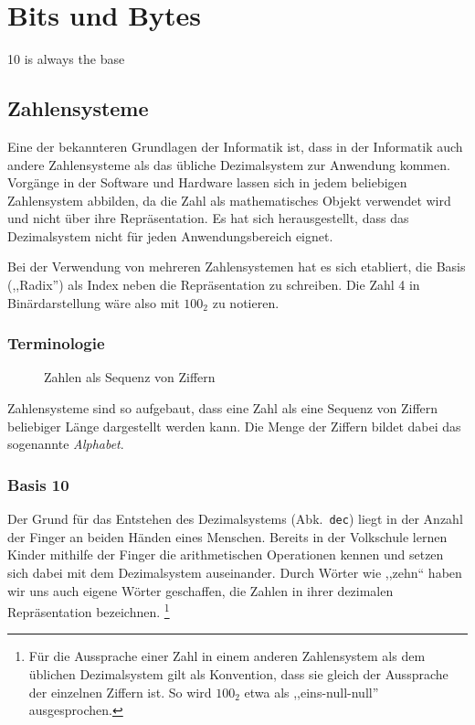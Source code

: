 \chapter{Bits und Bytes}
\epigraph{10 is always the base}{}
\newcommand{\short}[1]{Abk.~\texttt{#1}}
%
\section{Zahlensysteme}
%
Eine der bekannteren Grundlagen der Informatik ist, dass in der Informatik
auch andere Zahlensysteme als das übliche Dezimalsystem zur Anwendung kommen.
Vorgänge in der Software und Hardware lassen sich in jedem beliebigen
Zahlensystem abbilden, da die Zahl als mathematisches Objekt verwendet wird
und nicht über ihre Repräsentation. Es hat sich herausgestellt, dass das
Dezimalsystem nicht für jeden Anwendungsbereich eignet.

Bei der Verwendung von mehreren Zahlensystemen hat es sich etabliert,
die Basis (,,Radix'') als Index neben die Repräsentation zu schreiben.
Die Zahl 4 in Binärdarstellung wäre also mit $100_2$ zu notieren.
%
\subsection{Terminologie}
%
\begin{figure}[ht]
  \begin{center}
  \end{center}
  \caption{Zahlen als Sequenz von Ziffern}
  \label{fig:seq_digits}
\end{figure}

Zahlensysteme sind so aufgebaut, dass eine Zahl als eine Sequenz von Ziffern
beliebiger Länge dargestellt werden kann. Die Menge der Ziffern bildet dabei
das sogenannte \emph{Alphabet}.

\subsection{Basis 10}
\label{sec:bits_numeric_systems_10}
%
Der Grund für das Entstehen des Dezimalsystems (\short{dec}) liegt in der
Anzahl der Finger an beiden Händen eines Menschen. Bereits in der Volkschule
lernen Kinder mithilfe der Finger die arithmetischen Operationen kennen und
setzen sich dabei mit dem Dezimalsystem auseinander. Durch Wörter wie ,,zehn``
haben wir uns auch eigene Wörter geschaffen, die Zahlen in ihrer dezimalen
Repräsentation bezeichnen.%
\footnote{Für die Aussprache einer Zahl in einem anderen Zahlensystem als dem
üblichen Dezimalsystem gilt als Konvention, dass sie gleich der Aussprache der
einzelnen Ziffern ist. So wird $100_2$ etwa als ,,eins-null-null'' ausgesprochen.}

